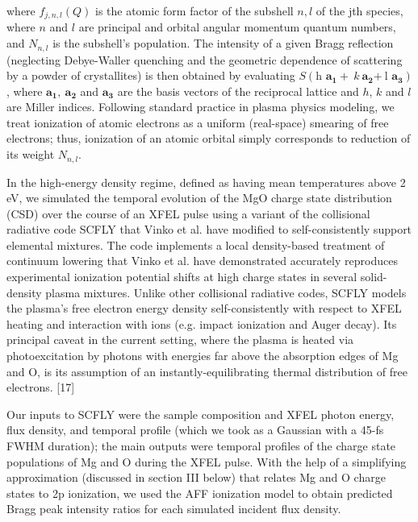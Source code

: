 where \(f_{j,n,l}\left( Q \right)\) is the atomic form factor of the
subshell \(n,l\) of the jth species, where \(n\) and \(l\) are principal
and orbital angular momentum quantum numbers, and \(N_{n,l}\) is the
subshell's population. The intensity of a given Bragg reflection
(neglecting Debye-Waller quenching and the geometric dependence of
scattering by a powder of crystallites) is then obtained by evaluating
\(S\left( \text{h\ }\mathbf{a}_{\mathbf{1}} + \ k\ \mathbf{a}_{\mathbf{2}}\mathbf{+ \ }\text{l\ }\mathbf{a}_{\mathbf{3}} \right)\),
where \(\mathbf{a}_{\mathbf{1}}\mathbf{,\ }\mathbf{a}_{\mathbf{2}}\) and
\(\mathbf{a}_{\mathbf{3}}\) are the basis vectors of the reciprocal
lattice and \(h\), \(k\) and \(l\) are Miller indices. Following
standard practice in plasma physics modeling, we treat ionization of
atomic electrons as a uniform (real-space) smearing of free electrons;
thus, ionization of an atomic orbital simply corresponds to reduction of
its weight \(N_{n,l}\).

In the high-energy density regime, defined as having mean temperatures
above 2 eV, we simulated the temporal evolution of the MgO charge state
distribution (CSD) over the course of an XFEL pulse using a variant of
the collisional radiative code SCFLY that Vinko et al. have modified to
self-consistently support elemental mixtures. \cite{CIRICOSTA2016MEASUREMENTS} The code
implements a local density-based treatment of continuum lowering that
Vinko et al. have demonstrated accurately reproduces experimental
ionization potential shifts at high charge states in several
solid-density plasma mixtures. Unlike other collisional radiative codes,
SCFLY models the plasma's free electron energy density self-consistently
with respect to XFEL heating and interaction with ions (e.g. impact
ionization and Auger decay). Its principal caveat in the current
setting, where the plasma is heated via photoexcitation by photons with
energies far above the absorption edges of Mg and O, is its assumption
of an instantly-equilibrating thermal distribution of free electrons.
{[}17{]}

Our inputs to SCFLY were the sample composition and XFEL photon energy,
flux density, and temporal profile (which we took as a Gaussian with a
45-fs FWHM duration); the main outputs were temporal profiles of the
charge state populations of Mg and O during the XFEL pulse. With the
help of a simplifying approximation (discussed in section III below)
that relates Mg and O charge states to 2p ionization, we used the AFF
ionization model to obtain predicted Bragg peak intensity ratios for
each simulated incident flux density.

